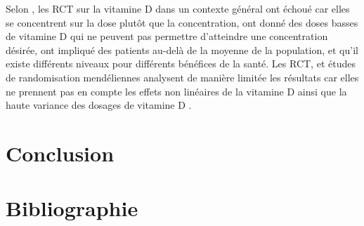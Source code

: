 \documentclass[
  a4paper,
  DIV=11,
  numbers=noendperiod,
  listof=totoc]{scrreprt}
\begin{document}
Selon \textcite{Grant.2022.nutrients}, les RCT sur la vitamine D dans un
contexte général ont échoué car elles se concentrent sur la dose plutôt
que la concentration, ont donné des doses basses de vitamine D qui ne
peuvent pas permettre d'atteindre une concentration désirée, ont
impliqué des patients au-delà de la moyenne de la population, et qu'il
existe différents niveaux pour différents bénéfices de la santé. Les
RCT, et études de randomisation mendéliennes analysent de manière
limitée les résultats car elles ne prennent pas en compte les effets non
linéaires de la vitamine D ainsi que la haute variance des dosages de
vitamine D \autocite{Grant.2022}.

\newpage{}

\chapter{Conclusion}\label{conclusion}

\newpage{}

\hypertarget{Bibliographie}{%
\chapter*{\centering Bibliographie}\label{Bibliographie}}
\singlespace

\printbibliography[heading=none]
\end{document}
